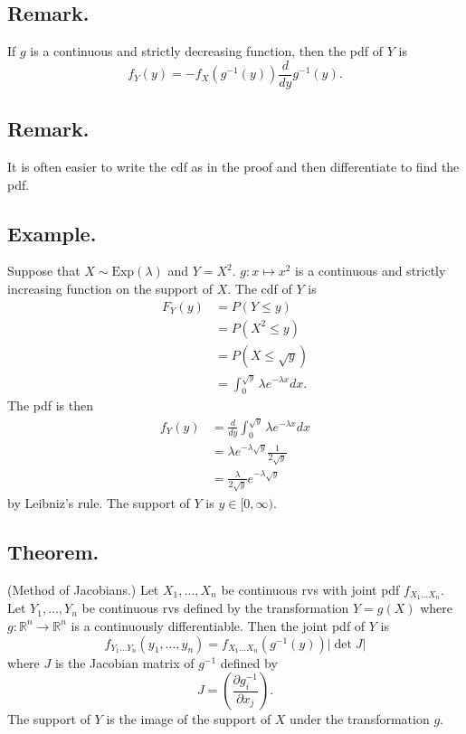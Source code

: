 \documentclass[titlepage]{article}
\begin{document}
\subsection{Remark.} If $g$ is a continuous and strictly decreasing function, then the pdf of $Y$ is
$$f_{Y}(y) = -f_{X}(g^{-1}(y))\frac{d}{dy}g^{-1}(y).$$

\subsection{Remark.} It is often easier to write the cdf as in the proof and then differentiate to find the pdf.

\subsection{Example.} Suppose that $X \sim \text{Exp}(\lambda)$ and $Y = X^{2}$. $g: x \mapsto x^{2}$ is a continuous and strictly increasing function on the support of $X$. The cdf of $Y$ is 
\begin{align*}
    F_{Y}(y) &= P(Y \leq y) \\
             &= P(X^{2} \leq y) \\
             &= P(X \leq \sqrt{y}) \\
             &= \int_{0}^{\sqrt{y}}\lambda e^{-\lambda x}dx.
\end{align*}
The pdf is then 
\begin{align*}
    f_{Y}(y) &= \frac{d}{dy}\int_{0}^{\sqrt{y}}\lambda e^{-\lambda x}dx \\
             &= \lambda e^{-\lambda \sqrt{y}}\frac{1}{2\sqrt{y}} \\
             &= \frac{\lambda}{2\sqrt{y}}e^{-\lambda \sqrt{y}}
\end{align*}
by Leibniz's rule. The support of $Y$ is $y \in [0, \infty)$.

\subsection{Theorem.} (Method of Jacobians.) Let $X_{1}, \ldots, X_{n}$ be continuous rvs with joint pdf $f_{X_{1}\ldots X_{n}}$. Let $Y_{1}, \ldots, Y_{n}$ be continuous rvs defined by the transformation $Y = g(X)$ where $g: \mathbb{R}^{n} \to \mathbb{R}^{n}$ is a continuously differentiable. Then the joint pdf of $Y$ is
$$f_{Y_{1}\ldots Y_{n}}(y_{1}, \ldots, y_{n}) = f_{X_{1}\ldots X_{n}}(g^{-1}(y))\left|\det J \right|$$
where $J$ is the Jacobian matrix of $g^{-1}$ defined by
$$J = \left( \frac{\partial g^{-1}_{i}}{\partial x_{j}} \right).$$
The support of $Y$ is the image of the support of $X$ under the transformation $g$.
\end{document}
